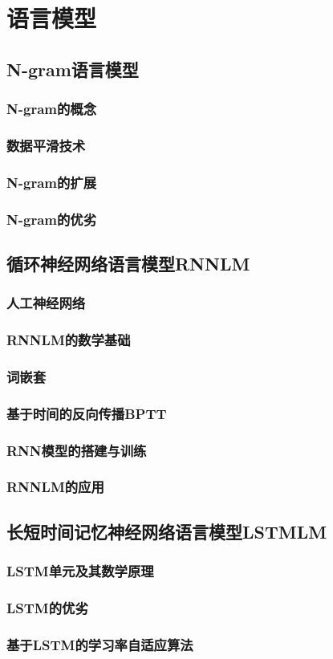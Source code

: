 
\chapter{语言模型}
\label{chap:lm}

\section{N-gram语言模型}
\subsection{N-gram的概念}
\subsection{数据平滑技术}
\subsection{N-gram的扩展}
\subsection{N-gram的优劣}

\section{循环神经网络语言模型RNNLM}
\subsection{人工神经网络}
\subsection{RNNLM的数学基础}
\subsection{词嵌套}
\subsection{基于时间的反向传播BPTT}
\subsection{RNN模型的搭建与训练}
\subsection{RNNLM的应用}

\section{长短时间记忆神经网络语言模型LSTMLM}
\subsection{LSTM单元及其数学原理}
\subsection{LSTM的优劣}
\subsection{基于LSTM的学习率自适应算法}
